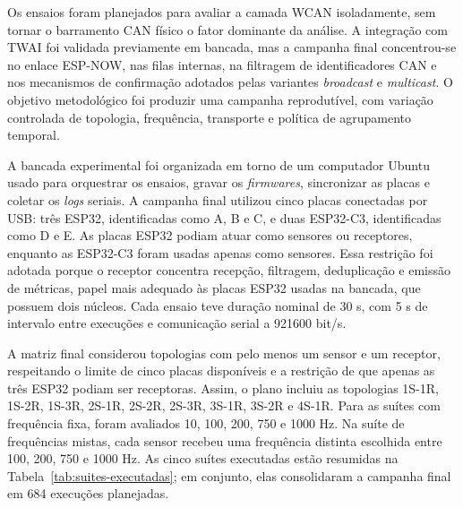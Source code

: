 Os ensaios foram planejados para avaliar a camada WCAN isoladamente, sem tornar
o barramento CAN físico o fator dominante da análise. A integração com TWAI foi
validada previamente em bancada, mas a campanha final concentrou-se no enlace
ESP-NOW, nas filas internas, na filtragem de identificadores CAN e nos mecanismos
de confirmação adotados pelas variantes \emph{broadcast} e \emph{multicast}. O
objetivo metodológico foi produzir uma campanha reprodutível, com variação
controlada de topologia, frequência, transporte e política de agrupamento
temporal.

A bancada experimental foi organizada em torno de um computador Ubuntu usado para
orquestrar os ensaios, gravar os \emph{firmwares}, sincronizar as placas e coletar
os \emph{logs} seriais. A campanha final utilizou cinco placas conectadas por
USB: três ESP32, identificadas como A, B e C, e duas ESP32-C3, identificadas como
D e E. As placas ESP32 podiam atuar como sensores ou receptores, enquanto as
ESP32-C3 foram usadas apenas como sensores. Essa restrição foi adotada porque o
receptor concentra recepção, filtragem, deduplicação e emissão de métricas, papel
mais adequado às placas ESP32 usadas na bancada, que possuem dois núcleos. Cada
ensaio teve duração nominal de 30 s, com 5 s de intervalo entre execuções e
comunicação serial a 921600 bit/s.

A matriz final considerou topologias com pelo menos um sensor e um receptor,
respeitando o limite de cinco placas disponíveis e a restrição de que apenas as
três ESP32 podiam ser receptoras. Assim, o plano incluiu as topologias 1S-1R,
1S-2R, 1S-3R, 2S-1R, 2S-2R, 2S-3R, 3S-1R, 3S-2R e 4S-1R. Para as suítes com
frequência fixa, foram avaliados 10, 100, 200, 750 e 1000 Hz. Na suíte de
frequências mistas, cada sensor recebeu uma frequência distinta escolhida entre
100, 200, 750 e 1000 Hz. As cinco suítes executadas estão resumidas na
Tabela~\ref{tab:suites-executadas}; em conjunto, elas consolidaram a campanha
final em 684 execuções planejadas.

